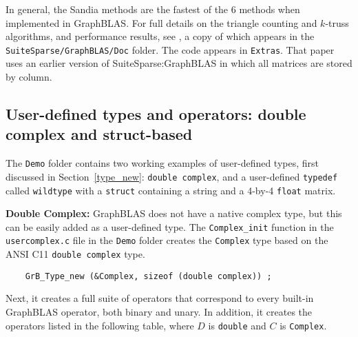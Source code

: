 \documentclass[12pt]{article}
\begin{document}
In general, the Sandia methods are the fastest of the 6 methods when
implemented in GraphBLAS.  For full details on the triangle counting and
$k$-truss algorithms, and performance results, see \cite{Davis18b}, a copy of
which appears in the \verb'SuiteSparse/GraphBLAS/Doc' folder.  The code appears
in \verb'Extras'.  That paper uses an earlier version of SuiteSparse:GraphBLAS
in which all matrices are stored by column.

\newpage
\subsection{User-defined types and operators: double complex and struct-based}
\label{user}

The \verb'Demo' folder contains two working examples of user-defined types,
first discussed in Section~\ref{type_new}: \verb'double complex', and a
user-defined \verb'typedef' called \verb'wildtype' with a \verb'struct'
containing a string and a 4-by-4 \verb'float' matrix.

{\bf Double Complex:}
GraphBLAS does not have a native complex type, but this can be easily added
as a user-defined type.  The \verb'Complex_init' function in the
\verb'usercomplex.c' file in the \verb'Demo' folder creates the
\verb'Complex' type based on the ANSI C11 \verb'double complex' type.

    {\footnotesize
    \begin{verbatim}
    GrB_Type_new (&Complex, sizeof (double complex)) ; \end{verbatim}}

Next, it creates a full suite of operators that correspond to every
built-in GraphBLAS operator, both binary and unary.  In addition, it
creates the operators listed in the following table, where $D$ is
\verb'double' and $C$ is \verb'Complex'.
\end{document}
